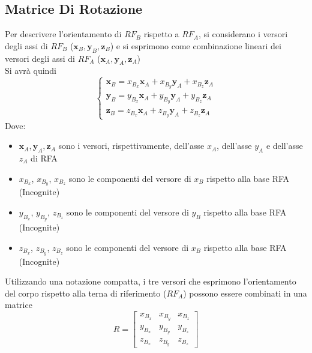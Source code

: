 ﻿\documentclass[11pt, a4paper]{article}
\begin{document}
\subsection{Matrice Di Rotazione}
Per descrivere l'orientamento di $ RF_{B} $ rispetto a $ RF_{A} $, si considerano i versori degli assi di $ RF_{B} $ ($ \mathbf{x}_{B}, \mathbf{y}_{B}, \mathbf{z}_{B} $) e si esprimono come combinazione lineari dei versori degli assi di $ RF_{A} $ ($ \mathbf{x}_{A}, \mathbf{y}_{A}, \mathbf{z}_{A} $)\\
Si avrà quindi
\[
    \begin{cases}
        \mathbf{x}_B = x_{B_x} \mathbf{x}_A + x_{B_y} \mathbf{y}_A + x_{B_z} \mathbf{z}_A\\
        \mathbf{y}_B = y_{B_x} \mathbf{x}_A + y_{B_y} \mathbf{y}_A + y_{B_z} \mathbf{z}_A\\
        \mathbf{z}_B = z_{B_x} \mathbf{x}_A + z_{B_y} \mathbf{y}_A + z_{B_z} \mathbf{z}_A
    \end{cases}
\]
Dove:
\begin{itemize}
    \item $\mathbf{x}_A, \mathbf{y}_A, \mathbf{z}_A$ sono i versori, rispettivamente, dell'asse $x_{A}$, dell'asse $y_{A}$ e dell'asse $z_{A}$ di RFA
    \item $x_{B_x}$, $x_{B_y}$, $x_{B_z}$ sono le componenti del versore di $x_{B}$ rispetto alla base RFA (Incognite)
    \item $y_{B_x}$, $y_{B_y}$, $z_{B_z}$ sono le componenti del versore di $y_{B}$ rispetto alla base RFA (Incognite)
    \item $z_{B_x}$, $z_{B_y}$, $z_{B_z}$ sono le componenti del versore di $x_{B}$ rispetto alla base RFA (Incognite)
\end{itemize}
Utilizzando una notazione compatta, i tre versori che esprimono l'orientamento del corpo rispetto alla terna di riferimento ($RF_{A}$) possono essere combinati in una matrice
\[
    R =
    \begin{bmatrix}
        x_{B_x} & x_{B_y} & x_{B_z}\\
        y_{B_x} & y_{B_y} & y_{B_z} \\
        z_{B_x} & z_{B_y} & z_{B_z}
    \end{bmatrix}
\]
\end{document}

